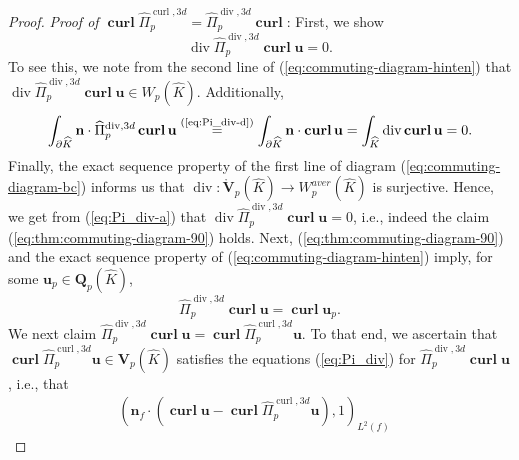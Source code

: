 \documentclass{article}
\newcommand{\hatPicurlcom}{\widehat \Pi^{\operatorname*{curl},3d}_p}
\newcommand{\hatPidivcom}{\widehat\Pi^{\operatorname*{div},3d}_{p}}
\begin{document}
\begin{proof}
\medskip\emph{Proof of $\operatorname*{\mathbf{curl}}\hatPicurlcom=\hatPidivcom\operatorname*{\mathbf{curl}}$}: 
First, we show
\begin{equation}
\operatorname*{div}\hatPidivcom%
\operatorname*{\mathbf{curl}}\mathbf{u}=0. \label{eq:thm:commuting-diagram-90}%
\end{equation}
To see this, we note from the second line of
(\ref{eq:commuting-diagram-hinten}) that $\operatorname*{div}\hatPidivcom\operatorname*{\mathbf{curl}}{\mathbf{u}}\in W_{p}%
(\widehat{K})$. Additionally,
\begin{equation}
\int_{\partial\widehat{K}}{\mathbf{n}}\cdot\hatPidivcom\operatorname*{\mathbf{curl}}\mathbf{u}%
\overset{\text{(\ref{eq:Pi_div-d})}}{=}\int_{\partial\widehat{K}}{\mathbf{n}%
}\cdot\operatorname*{\mathbf{curl}}\mathbf{u}=\int_{\widehat{K}}\operatorname*{div}%
\operatorname*{\mathbf{curl}}\mathbf{u}=0. \label{eq:thm:commuting-diagram-110}%
\end{equation}
Finally, the exact sequence property of the first line of diagram
(\ref{eq:commuting-diagram-bc}) informs us that $\operatorname*{div}:%
\mathring{\mathbf{V}}_{p}(\widehat{K})\rightarrow W^{aver}_p(\widehat K)$ is surjective. 
Hence, we get from (\ref{eq:Pi_div-a}) that
$\operatorname*{div}\hatPidivcom\operatorname*{\mathbf{curl}}\mathbf{u}=0$, 
i.e., indeed the claim (\ref{eq:thm:commuting-diagram-90}) holds. 
Next, 
(\ref{eq:thm:commuting-diagram-90}) and the exact sequence property of
(\ref{eq:commuting-diagram-hinten}) imply, 
for some $\mathbf{u}_{p}\in\mathbf{Q}_{p}(\widehat{K})$,
\begin{equation}
\hatPidivcom\operatorname*{\mathbf{curl}}\mathbf{u}%
=\operatorname*{\mathbf{curl}}\mathbf{u}_{p}. \label{eq:thm:commuting-diagram-100}%
\end{equation}
We next claim $\hatPidivcom\operatorname*{\mathbf{curl}}%
\mathbf{u}=\operatorname*{\mathbf{curl}}\hatPicurlcom\mathbf{u}$. 
To that end, we ascertain that $\operatorname*{\mathbf{curl}}%
\hatPicurlcom\mathbf{u}\in{\mathbf{V}}%
_{p}(\widehat{K})$ satisfies the equations (\ref{eq:Pi_div}) for
$\hatPidivcom\operatorname*{\mathbf{curl}}\mathbf{u}$, i.e., that 
\begin{subequations}
\label{eq:Pi_div-10}
\begin{align}
\label{eq:Pi_div-d-10}%
(\mathbf{n}_{f}\cdot(\operatorname*{\mathbf{curl}}\mathbf{u}-\operatorname*{\mathbf{curl}}%
\hatPicurlcom\mathbf{u}),1)_{L^{2}(f)}  &

\end{align}
\end{subequations}
\end{proof}
\end{document}
